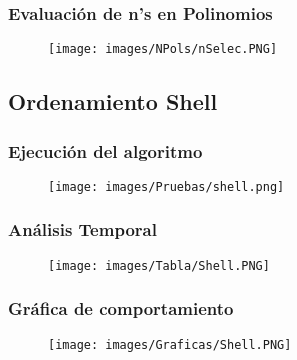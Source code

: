 \documentclass[12pt]{article}
\begin{document}
                \subsubsection{Evaluación de n's en Polinomios}
                            \begin{figure}[H]
        	            \centering
        	             \texttt{[image: images/NPols/nSelec.PNG]}
                \end{figure}
\newpage

		\subsection{Ordenamiento Shell}
    		\subsubsection{Ejecución del algoritmo}
        		\begin{figure}[H]
        	            \centering
        	            \texttt{[image: images/Pruebas/shell.png]}
                \end{figure}
    		\subsubsection{Análisis Temporal}
    		    \begin{figure}[H]
        	            \centering
        	             \texttt{[image: images/Tabla/Shell.PNG]}
                \end{figure}
    		\subsubsection{Gráfica de comportamiento}
    		    \begin{figure}[H]
        	            \centering
        	             \texttt{[image: images/Graficas/Shell.PNG]}
                \end{figure}
    		\newpage
    		
\end{document}
